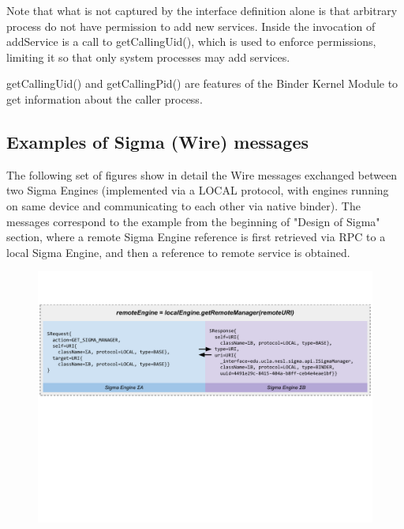 \documentclass[prodmode]{acmlarge}
\begin{document}
Note that what is not captured by the interface definition alone is that arbitrary process do not have permission to add new services. Inside the invocation of addService is a call to getCallingUid(), which is used to enforce permissions, limiting it so that only system processes may add services.

getCallingUid() and getCallingPid() are features of the Binder Kernel Module to get information about the caller process.


\subsection{Examples of Sigma (Wire) messages}
\label{app:WireExchange}
The following set of figures show in detail the Wire messages exchanged between two Sigma Engines (implemented via a LOCAL protocol, with engines running on same device and communicating to each other via native binder). The messages correspond to the example from the beginning of "Design of Sigma" section, where a remote Sigma Engine reference is first retrieved via RPC to a local Sigma Engine, and then a reference to remote service is obtained.
\begin{figure}[h!]
\centering
\includegraphics[width=\textwidth]{drawings/WireExchange1.pdf}
\end{figure}
\end{document}
